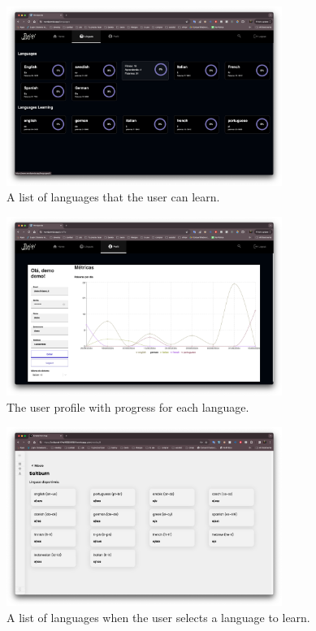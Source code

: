 \documentclass[12pt]{article}
\begin{document}
  \begin{figure}[h]
    \centering
    \caption{
    A list of languages that the user can learn. 
    }
    \label{fig:site2}
    \includegraphics[width=0.8\textwidth]{assets/21.png}
  \end{figure}

    \begin{figure}[h]
      \centering
      \caption{
      The user profile with progress for each language.
      }
      \label{fig:site3}
      \includegraphics[width=0.8\textwidth]{assets/22.png}
    \end{figure}

    \begin{figure}[h]
      \centering
      \caption{
      A list of languages when the user selects a language to learn.
      }
      \label{fig:site4}
      \includegraphics[width=0.8\textwidth]{assets/25.png}
    \end{figure}
\end{document}
